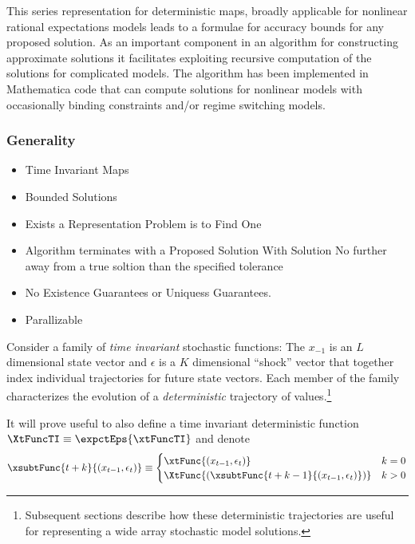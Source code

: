 \documentclass[12pt]{article}
\begin{document}
This series representation for deterministic maps,
broadly applicable for nonlinear rational expectations models 
leads to a formulae for accuracy bounds for any proposed solution.
As an important component in an algorithm for
constructing approximate solutions it
facilitates exploiting recursive computation of the solutions for complicated models.
The algorithm has been implemented in
Mathematica code that can compute solutions for
nonlinear models with occasionally binding constraints and/or regime switching models.






\subsubsection{Generality}
\label{sec:generality}




\begin{itemize}
\item Time Invariant Maps
\item Bounded Solutions
\item Exists a Representation Problem is to Find One
\item Algorithm terminates with a Proposed Solution With Solution
  No further away from a true soltion than the specified tolerance 
\item No Existence Guarantees or Uniquess Guarantees.
\item Parallizable
\end{itemize}


Consider a family of {\it time invariant } stochastic functions:
The $x_{-1}$ is an  $L$ dimensional state vector and $\epsilon$ is a $K$ dimensional ``shock'' vector that together index
individual trajectories for future state vectors.  
Each member of the family characterizes the evolution of a {\em deterministic} trajectory of values.\footnote{Subsequent sections describe how these deterministic trajectories are useful for representing a wide array stochastic model solutions.}

It will prove useful to also define a time invariant deterministic function $\XtFuncTI\equiv \expctEps{\xtFuncTI}$ and denote
\begin{gather*}
\xsubtFunc{t+k}{(x_{t-1},\epsilon_t)}\equiv\begin{cases}
\xtFunc{(x_{t-1},\epsilon_t)} &k=0\\
\XtFunc{(\xsubtFunc{t+k-1}{(x_{t-1},\epsilon_t)})} &k>0
\end{cases}
\end{gather*}
\end{document}
